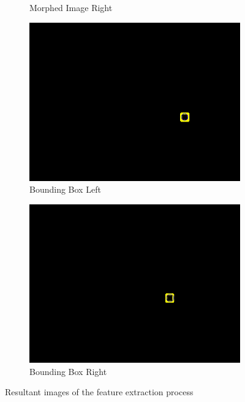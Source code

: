 \begin{figure}[ht!]
\begin{subfigure}{.5\textwidth}
  \caption{Morphed Image Right}
  \label{fig:sfig6}
\end{subfigure}
\begin{subfigure}{.5\textwidth}
  \centering
  \includegraphics[width=.8\linewidth]{Images/bigbbox_left.png}
  \caption{Bounding Box Left}
  \label{fig:sfig7}
\end{subfigure}
\begin{subfigure}{.5\textwidth}
  \centering
  \includegraphics[width=.8\linewidth]{Images/bigbbox_right.png}
  \caption{Bounding Box Right}
  \label{fig:sfig8}
\end{subfigure}
\caption{Resultant images of the feature extraction process}
\label{fig:feature_extraction}
\end{figure}
